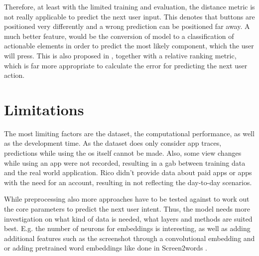 Therefore, at least with the limited training and evaluation, the distance metric is not really applicable to predict the next user input.
This denotes that buttons are positioned very differently and a wrong prediction can be positioned far away.
A much better feature, would be the conversion of model to a classification of actionable elements in order to predict the most likely component, which the user will press.
This is also proposed in \cite{zhou2021large}, together with a relative ranking metric, which is far more appropriate to calculate the error for predicting the next user action.


\section{Limitations}
\label{sec:limitations}

The most limiting factors are the dataset, the computational performance, as well as the development time.
As the dataset does only consider app traces, predictions while using the \gls{os} itself cannot be made.
Also, some view changes while using an app were not recorded, resulting in a gab between training data and the real world application.
Rico didn't provide data about paid apps or apps with the need for an account, resulting in not reflecting the day-to-day scenarios.

While preprocessing also more approaches have to be tested against to work out the core parameters to predict the next user intent.
Thus, the model needs more investigation on what kind of data is needed, what layers and methods are suited best.
E.g. the number of neurons for embeddings is interesting, as well as adding additional features such as the screenshot through a convolutional embedding and
or adding pretrained word embeddings like done in Screen2words \cite{wang2021screen2words}.


